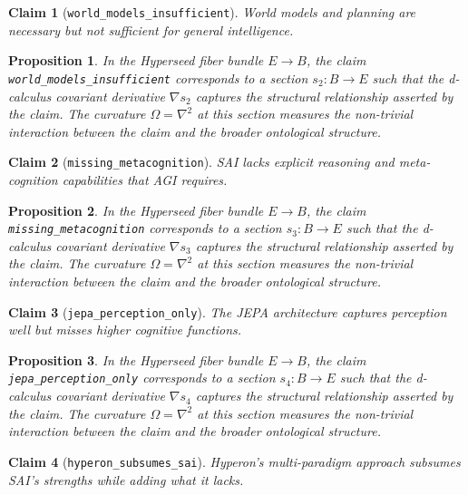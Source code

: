 \documentclass{article}
\newtheorem{claim}{Claim}
\newtheorem{proposition}{Proposition}
\begin{document}
\begin{claim}[\texttt{world_models_insufficient}]
World models and planning are necessary but not sufficient for general intelligence.
\end{claim}

\begin{proposition}
In the Hyperseed fiber bundle $E \to B$, the claim \texttt{world_models_insufficient} corresponds to a section $s_2: B \to E$ such that the d-calculus covariant derivative $\nabla s_2$ captures the structural relationship asserted by the claim. The curvature $\Omega = \nabla^2$ at this section measures the non-trivial interaction between the claim and the broader ontological structure.
\end{proposition}

\begin{claim}[\texttt{missing_metacognition}]
SAI lacks explicit reasoning and meta-cognition capabilities that AGI requires.
\end{claim}

\begin{proposition}
In the Hyperseed fiber bundle $E \to B$, the claim \texttt{missing_metacognition} corresponds to a section $s_3: B \to E$ such that the d-calculus covariant derivative $\nabla s_3$ captures the structural relationship asserted by the claim. The curvature $\Omega = \nabla^2$ at this section measures the non-trivial interaction between the claim and the broader ontological structure.
\end{proposition}

\begin{claim}[\texttt{jepa_perception_only}]
The JEPA architecture captures perception well but misses higher cognitive functions.
\end{claim}

\begin{proposition}
In the Hyperseed fiber bundle $E \to B$, the claim \texttt{jepa_perception_only} corresponds to a section $s_4: B \to E$ such that the d-calculus covariant derivative $\nabla s_4$ captures the structural relationship asserted by the claim. The curvature $\Omega = \nabla^2$ at this section measures the non-trivial interaction between the claim and the broader ontological structure.
\end{proposition}

\begin{claim}[\texttt{hyperon_subsumes_sai}]
Hyperon's multi-paradigm approach subsumes SAI's strengths while adding what it lacks.
\end{claim}
\end{document}
